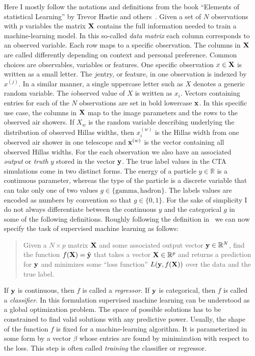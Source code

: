 Here I mostly follow the notations and definitions from the book \enquote{Elements of statistical Learning} by Trevor Hastie and others~\cite{hasties}.
Given a set of $N$ observations with $p$ variables the matrix $\mathbf{X}$ 
contains the full information needed to train a machine-learning model. In this so-called \emph{data matrix}
each column corresponds to an observed variable. Each row maps to a specific observation.
The columns in $\mathbf{X}$ are called differently depending on context and personal preference. 
Common choices are observables, variables or features. 
One specific observation $x \in \mathbf{X}$ is written as a small letter. 
The $j$\th entry, or feature, in one observation is indexed by $x^{(j)}$.
In a similar manner,
a single uppercase letter such as $X$ denotes a generic random variable.
The $i$\th observed value of $X$ is written as $x_i$. 
Vectors containing entries for each of the $N$ observations are set in bold lowercase $\mathbf{x}$.
In this specific use case, the columns in $\mathbf{X}$ map to the image parameters and the rows to the observed air showers. 
If $X_{w}$ is the random variable describing underlying the distribution of observed Hillas widths, then
$x^{(w)}_{i}$ is the Hillas width from one observed air shower in one telescope and $\mathbf{x}^{(w)}$ is the vector containing all observed Hillas widths.
For the each observation we also have an associated \emph{output} or \emph{truth} $y$ stored in the vector $\mathbf{y}$.
The true label values in the CTA simulations come in two distinct forms. 
The energy of a particle $y \in \mathbb{R}$ is a continuous parameter, 
whereas the type of the particle is a discrete variable that can take only one of two values $g \in \{\text{gamma}, \text{hadron}\}$.
The labels values are encoded as numbers by convention so that $g \in \{0, 1\}$.
For the sake of simplicity I do not always differentiate between the continuous $y$ and the categorical $g$ in some of the following definitions.
Roughly following the definition in~\cite[10]{hasties} we can now specify the task of supervised machine learning as follows:
\begin{quote}
    Given a $N \times p$ matrix $\mathbf{X}$ and some associated output vector $\mathbf{y} \in \mathbb{R}^N$,
    find the function $f(\mathbf{X}) = \hat{\mathbf{{y}}}$ that takes a vector $\mathbf{X} \in \mathbb{R}^p$ and returns a prediction for $\mathbf{y}$
    and minimizes some \enquote{loss function} $L(\mathbf{y}, f(\mathbf{X}))$ over the data and the true label. 
\end{quote}
If $\mathbf{y}$ is continuous, then $f$ is called a \emph{regressor}. If $\mathbf{y}$ is categorical, then $f$ is called a \emph{classifier}.
In this formulation supervised machine learning can be understood as a global optimization problem. 
The space of possible solutions has to be constrained to find valid solutions with any predictive power.
Usually, the shape of the function $f$ is fixed for a machine-learning algorithm. It is parameterized in some form by a vector $\beta$ 
whose entries are found by minimization with respect to the loss. This step is often called \emph{training} the 
classifier or regressor.


